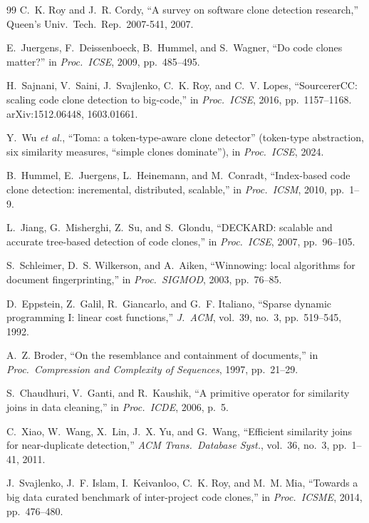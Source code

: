 \documentclass[10pt,a4paper]{article}
\begin{document}
\begin{thebibliography}{99}
\small
{} C.~K. Roy and J.~R. Cordy, ``A survey on software clone detection research,''
Queen's Univ.\ Tech.\ Rep.\ 2007-541, 2007.

 E.~Juergens, F.~Deissenboeck, B.~Hummel, and S.~Wagner, ``Do code clones matter?''
in \emph{Proc.\ ICSE}, 2009, pp.~485--495.

 H.~Sajnani, V.~Saini, J.~Svajlenko, C.~K. Roy, and C.~V. Lopes,
``SourcererCC: scaling code clone detection to big-code,'' in \emph{Proc.\ ICSE}, 2016,
pp.~1157--1168. arXiv:1512.06448, 1603.01661.

 Y.~Wu \emph{et al.}, ``Toma: a token-type-aware clone detector'' (token-type
abstraction, six similarity measures, ``simple clones dominate''), in \emph{Proc.\ ICSE}, 2024.

 B.~Hummel, E.~Juergens, L.~Heinemann, and M.~Conradt, ``Index-based code clone
detection: incremental, distributed, scalable,'' in \emph{Proc.\ ICSM}, 2010, pp.~1--9.

 L.~Jiang, G.~Misherghi, Z.~Su, and S.~Glondu, ``DECKARD: scalable and accurate
tree-based detection of code clones,'' in \emph{Proc.\ ICSE}, 2007, pp.~96--105.

 S.~Schleimer, D.~S. Wilkerson, and A.~Aiken, ``Winnowing: local algorithms for
document fingerprinting,'' in \emph{Proc.\ SIGMOD}, 2003, pp.~76--85.

 D.~Eppstein, Z.~Galil, R.~Giancarlo, and G.~F. Italiano, ``Sparse dynamic
programming I: linear cost functions,'' \emph{J.\ ACM}, vol.~39, no.~3, pp.~519--545, 1992.

 A.~Z. Broder, ``On the resemblance and containment of documents,'' in
\emph{Proc.\ Compression and Complexity of Sequences}, 1997, pp.~21--29.

 S.~Chaudhuri, V.~Ganti, and R.~Kaushik, ``A primitive operator for
similarity joins in data cleaning,'' in \emph{Proc.\ ICDE}, 2006, p.~5.

 C.~Xiao, W.~Wang, X.~Lin, J.~X. Yu, and G.~Wang, ``Efficient similarity joins for
near-duplicate detection,'' \emph{ACM Trans.\ Database Syst.}, vol.~36, no.~3, pp.~1--41, 2011.

 J.~Svajlenko, J.~F. Islam, I.~Keivanloo, C.~K. Roy, and M.~M. Mia,
``Towards a big data curated benchmark of inter-project code clones,'' in \emph{Proc.\ ICSME}, 2014,
pp.~476--480.
\end{thebibliography}
\end{document}
